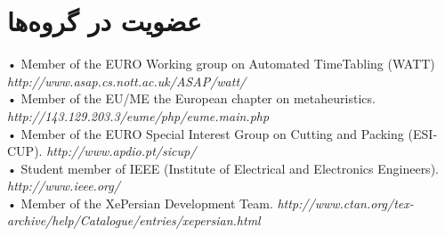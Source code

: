 \documentclass[11pt,a4paper]{bidimoderncv}
\begin{document}
\section{عضویت در گروه‌ها}
\begin{latin}
\begin{flushleft}
{\small • Member of the EURO Working group on Automated TimeTabling (WATT) \hfill {\scriptsize\em http://www.asap.cs.nott.ac.uk/ASAP/watt/}}\\
{\small • Member of the EU/ME the European chapter on metaheuristics. \hfill {\scriptsize\em http://143.129.203.3/eume/php/eume.main.php}}\\
{\small • Member of the EURO Special Interest Group on Cutting and Packing (ESICUP). \hfill {\scriptsize\em http://www.apdio.pt/sicup/}}\\
{\small • Student member of IEEE (Institute of Electrical and Electronics Engineers). \hfill {\scriptsize\em http://www.ieee.org/}}\\
{\small • Member of the XePersian  Development Team. \hfill {\scriptsize\em http://www.ctan.org/tex-archive/help/Catalogue/entries/xepersian.html}}\\
\end{flushleft}
\end{latin}

\nocite{*}


\end{document}
